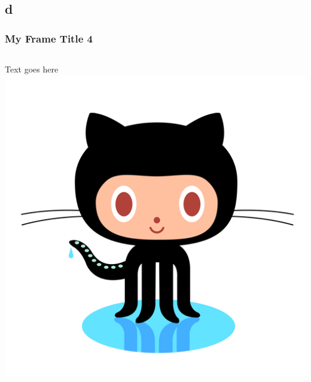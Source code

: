 \documentclass{beamer} %
\begin{document}
\subsection{d} 
\begin{frame}
\frametitle{My Frame Title 4} 
	\begin{columns}
	 Text goes here
	\centering
	\includegraphics[scale=.3]{git.png}
	\end{columns}	
\end{frame}
\end{document}
